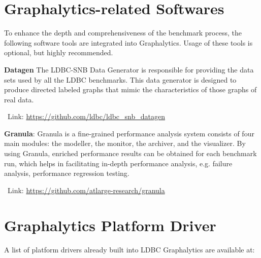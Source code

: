 \section{Graphalytics-related Softwares}\label{sec:instructions:related}
To enhance the depth and comprehensiveness of the benchmark process, the following software tools are integrated into Graphalytics. Usage of these tools is optional, but highly recommended.


\textbf{Datagen} The LDBC-SNB Data Generator is responsible for providing the data sets used by all the LDBC benchmarks. This data generator is designed to produce directed labeled graphs that mimic the characteristics of those graphs of real data. 

\-\ Link: \url{https://github.com/ldbc/ldbc_snb_datagen}



\textbf{Granula}:  Granula is a fine-grained performance analysis system consists of four main modules: the modeller, the monitor, the archiver, and the visualizer. 
By using Granula, enriched performance results can be obtained for each benchmark run, which helps in facilitating in-depth performance analysis, e.g. failure analysis, performance regression testing.

\-\ Link: \url{https://github.com/atlarge-research/granula}







\section{Graphalytics Platform Driver}\label{sec:instructions:drivers}
A list of platform drivers already built into LDBC Graphalytics are available at:

